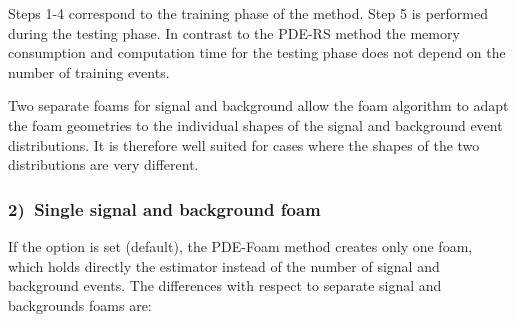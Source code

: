 Steps 1-4 correspond to the training phase of the method. Step 5 is
performed during the testing phase. In contrast to the PDE-RS method
the memory consumption and computation time for the testing phase does
not depend on the number of training events.

Two separate foams for signal and background allow the foam algorithm to 
adapt the foam geometries to the individual shapes of the signal and 
background event distributions. It is therefore well suited for cases 
where the shapes of the two distributions are very different.

\subsubsection*{2)~Single signal and background foam} 

If the option  is set (default), the PDE-Foam
method creates only one foam, which holds directly the estimator
instead of the number of signal and background events.  The
differences with respect to separate signal and backgrounds foams are:

